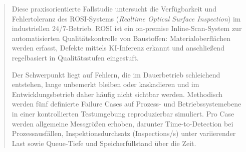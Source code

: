 
\begin{abstract}
\setlength{\parindent}{0pt}

\noindent Diese praxisorientierte Fallstudie untersucht die Verfügbarkeit und Fehlertoleranz des ROSI-Systems (\textit{Realtime Optical Surface Inspection}) im industriellen 24/7-Betrieb. ROSI ist ein on-premise Inline-Scan-System zur automatisierten Qualitätskontrolle von Baustoffen: Materialoberflächen werden erfasst, Defekte mittels KI-Inferenz erkannt und anschließend regelbasiert in Qualitätsstufen eingestuft.

\noindent Der Schwerpunkt liegt auf Fehlern, die im Dauerbetrieb schleichend entstehen, lange unbemerkt bleiben oder kaskadieren und im Entwicklungsbetrieb daher häufig nicht sichtbar werden. Methodisch werden fünf definierte Failure Cases auf Prozess- und Betriebssystemebene in einer kontrollierten Testumgebung reproduzierbar simuliert. Pro Case werden allgemeine Messgrößen erhoben, darunter Time-to-Detection bei Prozessausfällen, Inspektionsdurchsatz (Inspections/s) unter variierender Last sowie Queue-Tiefe und Speicherfüllstand über die Zeit.

\end{abstract}
